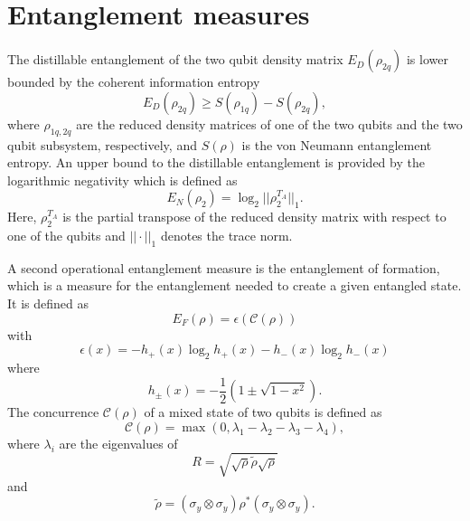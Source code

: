 \section{Entanglement measures}
The distillable entanglement of the two qubit density matrix $E_D(\rho_{2q})$ is lower bounded by the coherent information entropy
\begin{equation}
E_D(\rho_{2q}) \geq S(\rho_{1q}) - S(\rho_{2q}),
\end{equation}
where $\rho_{1q,2q}$ are the reduced density matrices of one of the two qubits and the two qubit subsystem, respectively, and $S(\rho)$ is the von Neumann entanglement entropy.
An upper bound to the distillable entanglement is provided by the logarithmic negativity\autocite{Vidal2002} which is defined as
\begin{equation}
E_N(\rho_2) = \log_2 || \rho_2^{T_A} ||_1.
\end{equation}
Here, $\rho_2^{T_A}$ is the partial transpose of the reduced density matrix with respect to one of the qubits and $|| \cdot ||_1$ denotes the trace norm.

A second operational entanglement measure is the entanglement of formation, which is a measure for the entanglement needed to create a given entangled state.%
It is defined as
\begin{equation}
E_F(\rho) = \epsilon(\mathcal{C}(\rho))
\end{equation}
with
\begin{equation}
\epsilon(x) = -h_+(x) \log_2 h_+(x) - h_-(x)\log_2 h_-(x)
\end{equation}
where
\begin{equation}
h_{\pm}(x) = -\frac{1}{2} \left(1\pm \sqrt{1-x^2} \right).
\end{equation}
The concurrence $\mathcal{C}(\rho)$ of a mixed state of two qubits is defined as
\begin{equation}
\mathcal{C}(\rho) = \max \left(0,\lambda_1-\lambda_2-\lambda_3-\lambda_4\right),
\end{equation}
where $\lambda_i$ are the eigenvalues of
\begin{equation}
R = \sqrt{\sqrt{\rho}\tilde{\rho}\sqrt{\rho}}
\end{equation}
and
\begin{equation}
\tilde{\rho} = (\sigma_{y}\otimes\sigma_{y})\rho^{*}(\sigma_{y}\otimes\sigma_{y}).
\end{equation}
